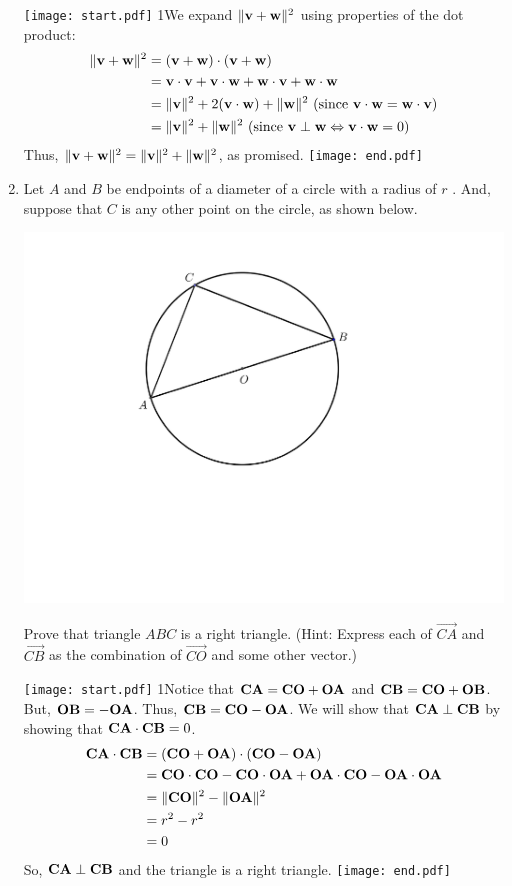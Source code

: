 \documentclass[12pt]{article}
\begin{document}
\begin{enumerate}
\texttt{[image: start.pdf]}
{{{1\linewidth}{We expand $\|{\bf v}+{\bf w}\|^2$ using properties of the dot product:
\begin{align*}
\|{\bf v}+{\bf w}\|^2&=({\bf v}+{\bf w})\cdot({\bf v}+{\bf w})\\
&={\bf v}\cdot{\bf v}+{\bf v}\cdot{\bf w}+{\bf w}\cdot{\bf v}+{\bf w}\cdot{\bf w}\\
&=\|{\bf v}\|^2+2({\bf v}\cdot {\bf w})+\|{\bf w}\|^2 \text{ (since } {\bf v}\cdot {\bf w}={\bf w}\cdot {\bf v})\\
&=\|{\bf v}\|^2+\|{\bf w}\|^2 \text{ (since }{\bf v}\perp{\bf w}\Leftrightarrow {\bf v}\cdot{\bf w}=0)
\end{align*}
Thus, $\|{\bf v}+{\bf w}\|^2=\|{\bf v}\|^2+\|{\bf w}\|^2$, as promised.
}}}
\texttt{[image: end.pdf]}


\item Let $A$ and $B$ be endpoints of a diameter of a circle with a radius of $r$ .  And, suppose that $C$ is any other point on the circle, as shown below. 
\begin{center}
\includegraphics[scale=0.5]{circle.pdf}
\end{center}
 Prove that triangle $ABC$ is a right triangle.  (Hint: Express each of $\overrightarrow{CA}$ and $\overrightarrow{CB}$ as the combination of $\overrightarrow{CO}$ and some other vector.)

\texttt{[image: start.pdf]}
{{{1\linewidth}{Notice that ${\bf CA}={\bf CO}+{\bf OA}$ and ${\bf CB}={\bf CO}+{\bf OB}$.  But, ${\bf OB}=-{\bf OA}$.  Thus, ${\bf CB}={\bf CO}-{\bf OA}$.  We will show that ${\bf CA} \perp {\bf CB}$ by showing that ${\bf CA} \cdot {\bf CB}=0$.
\begin{align*}
{\bf CA}\cdot {\bf CB}&=\left({\bf CO}+{\bf OA}\right) \cdot \left({\bf CO}-{\bf OA}\right)\\
&= {\bf CO}\cdot{\bf CO}-{\bf CO}\cdot {\bf OA}+{\bf OA}\cdot{\bf CO}-{\bf OA}\cdot{\bf OA}\\
&=\|{\bf CO}\|^2-\|{\bf OA}\|^2\\
&=r^2-r^2\\
&=0
\end{align*}
So, ${\bf CA}\perp{\bf CB}$ and the triangle is a right triangle.
}}}
\texttt{[image: end.pdf]}



\end{enumerate}
\end{document}

